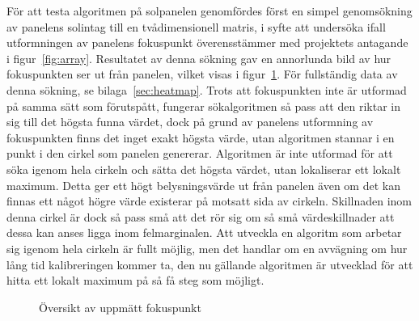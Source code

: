             För att testa algoritmen på solpanelen genomfördes först en simpel genomsökning av panelens solintag till en tvådimensionell matris, i syfte att undersöka ifall utformningen av panelens fokuspunkt överensstämmer med projektets antagande i figur~\ref{fig:array}. Resultatet av denna sökning gav en annorlunda bild av hur fokuspunkten ser ut från panelen, vilket visas i figur~\ref{fig:array1}. För fullständig data av denna sökning, se bilaga~\ref{sec:heatmap}. Trots att fokuspunkten inte är utformad på samma sätt som förutspått, fungerar sökalgoritmen så pass att den riktar in sig till det högsta funna värdet, dock på grund av panelens utformning av fokuspunkten finns det inget exakt högsta värde, utan algoritmen stannar i en punkt i den cirkel som panelen genererar. Algoritmen är inte utformad för att söka igenom hela cirkeln och sätta det högsta värdet, utan lokaliserar ett lokalt maximum. Detta ger ett högt belysningsvärde ut från panelen även om det kan finnas ett något högre värde existerar på motsatt sida av cirkeln. Skillnaden inom denna cirkel är dock så pass små att det rör sig om så små värdeskillnader att dessa kan anses ligga inom felmarginalen. Att utveckla en algoritm som arbetar sig igenom hela cirkeln är fullt möjlig, men det handlar om en avvägning om hur lång tid kalibreringen kommer ta, den nu gällande algoritmen är utvecklad för att hitta ett lokalt maximum på så få steg som möjligt.
        

            \begin{figure}
            \centering
                \setlength{\fboxsep}{0pt}
                \caption{\label{fig:array1}Översikt av uppmätt fokuspunkt}
            \end{figure}

